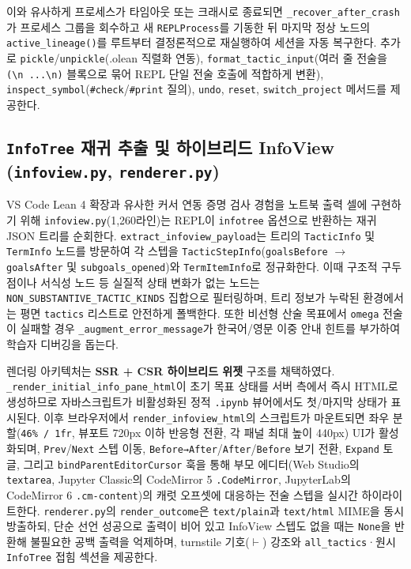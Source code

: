 \documentclass[journal]{IEEEtran}
\newcommand{\code}[1]{\texttt{#1}}
\begin{document}
이와 유사하게 프로세스가 타임아웃 또는 크래시로 종료되면 \code{\_recover\_after\_crash}가 프로세스 그룹을 회수하고 새 \code{REPLProcess}를 기동한 뒤 마지막 정상 노드의 \code{active\_lineage()}를 루트부터 결정론적으로 재실행하여 세션을 자동 복구한다. 추가로 \code{pickle}/\code{unpickle}(.olean 직렬화 연동), \code{format\_tactic\_input}(여러 줄 전술을 \code{(\textbackslash n  ...\textbackslash n)} 블록으로 묶어 REPL 단일 전술 호출에 적합하게 변환), \code{inspect\_symbol}(\code{\#check}/\code{\#print} 질의), \code{undo}, \code{reset}, \code{switch\_project} 메서드를 제공한다.

\subsection{\code{InfoTree} 재귀 추출 및 하이브리드 InfoView (\code{infoview.py}, \code{renderer.py})}
VS Code Lean 4 확장과 유사한 커서 연동 증명 검사 경험을 노트북 출력 셀에 구현하기 위해 \code{infoview.py}(1,260라인)는 REPL이 \code{infotree} 옵션으로 반환하는 재귀 JSON 트리를 순회한다. \code{extract\_infoview\_payload}는 트리의 \code{TacticInfo} 및 \code{TermInfo} 노드를 방문하여 각 스텝을 \code{TacticStepInfo}(\code{goalsBefore} $\rightarrow$ \code{goalsAfter} 및 \code{subgoals\_opened})와 \code{TermItemInfo}로 정규화한다. 이때 구조적 구두점이나 서식성 노드 등 실질적 상태 변화가 없는 노드는 \code{NON\_SUBSTANTIVE\_TACTIC\_KINDS} 집합으로 필터링하며, 트리 정보가 누락된 환경에서는 평면 \code{tactics} 리스트로 안전하게 폴백한다. 또한 비선형 산술 목표에서 \code{omega} 전술이 실패할 경우 \code{\_augment\_error\_message}가 한국어/영문 이중 안내 힌트를 부가하여 학습자 디버깅을 돕는다.

렌더링 아키텍처는 \textbf{SSR + CSR 하이브리드 위젯} 구조를 채택하였다. \code{\_render\_initial\_info\_pane\_html}이 초기 목표 상태를 서버 측에서 즉시 HTML로 생성하므로 자바스크립트가 비활성화된 정적 \code{.ipynb} 뷰어에서도 첫/마지막 상태가 표시된다. 이후 브라우저에서 \code{render\_infoview\_html}의 스크립트가 마운트되면 좌우 분할(\code{46\% / 1fr}, 뷰포트 720px 이하 반응형 전환, 각 패널 최대 높이 440px) UI가 활성화되며, \code{Prev}/\code{Next} 스텝 이동, \code{Before→After}/\code{After}/\code{Before} 보기 전환, \code{Expand} 토글, 그리고 \code{bindParentEditorCursor} 훅을 통해 부모 에디터(Web Studio의 \code{textarea}, Jupyter Classic의 CodeMirror 5 \code{.CodeMirror}, JupyterLab의 CodeMirror 6 \code{.cm-content})의 캐럿 오프셋에 대응하는 전술 스텝을 실시간 하이라이트한다. \code{renderer.py}의 \code{render\_outcome}은 \code{text/plain}과 \code{text/html} MIME을 동시 방출하되, 단순 선언 성공으로 출력이 비어 있고 InfoView 스텝도 없을 때는 \code{None}을 반환해 불필요한 공백 출력을 억제하며, turnstile 기호($\vdash$) 강조와 \code{all\_tactics}·원시 \code{InfoTree} 접힘 섹션을 제공한다.
\end{document}
